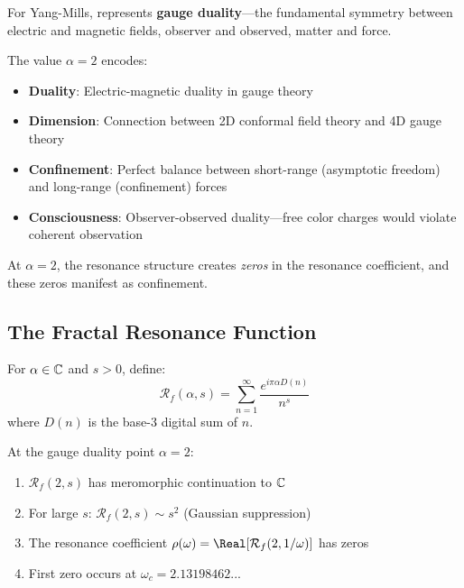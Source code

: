 For Yang-Mills,  represents \textbf{gauge duality}—the fundamental symmetry between electric and magnetic fields, observer and observed, matter and force.

\begin{keyidea}
The value $\alpha = 2$ encodes:
\begin{itemize}
\item \textbf{Duality}: Electric-magnetic duality in gauge theory
\item \textbf{Dimension}: Connection between 2D conformal field theory and 4D gauge theory
\item \textbf{Confinement}: Perfect balance between short-range (asymptotic freedom) and long-range (confinement) forces
\item \textbf{Consciousness}: Observer-observed duality—free color charges would violate coherent observation
\end{itemize}

At $\alpha = 2$, the resonance structure creates \textit{zeros} in the resonance coefficient, and these zeros manifest as confinement.
\end{keyidea}

\subsection{The Fractal Resonance Function}

\begin{defn}\label{def:fractal-resonance-ym}
For $\alpha \in \mathbb{C}$ and $s > 0$, define:
\begin{equation}
\mathcal{R}_f(\alpha, s) = \sum_{n=1}^{\infty} \frac{e^{i\pi\alpha D(n)}}{n^s}
\end{equation}
where $D(n)$ is the base-3 digital sum of $n$.
\end{defn}

\begin{theorem}[Properties at $\alpha = 2$]\label{thm:alpha-2-properties}
At the gauge duality point $\alpha = 2$:
\begin{enumerate}
\item $\mathcal{R}_f(2, s)$ has meromorphic continuation to $\mathbb{C}$
\item For large $s$: $\mathcal{R}_f(2, s) \sim s^2$ (Gaussian suppression)
\item The resonance coefficient $\rho(\omega) = \Real[\mathcal{R}_f(2, 1/\omega)]$ has zeros
\item First zero occurs at $\omega_c = 2.13198462...$
\end{enumerate}
\end{theorem}

